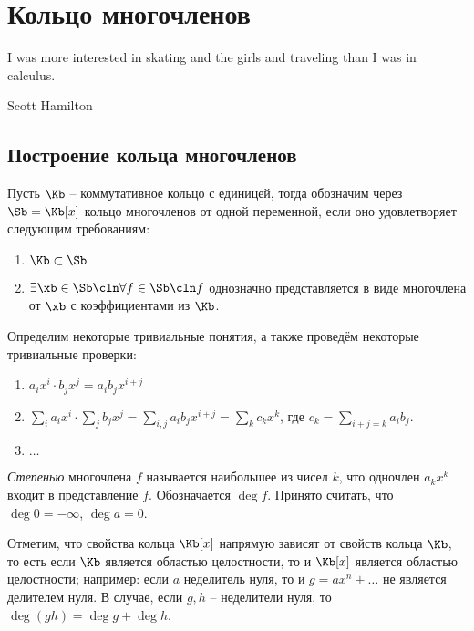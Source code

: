 \section{Кольцо многочленов}
\label{polynom}

\epigraph{I was more interested in skating and the girls and traveling
  than I was in calculus.}{Scott Hamilton}

\subsection{Построение кольца многочленов}

Пусть $\Kb$ -- коммутативное кольцо с единицей, тогда обозначим через $\Sb=\Kb[x]$ кольцо многочленов от одной переменной, если оно удовлетворяет следующим требованиям:

\begin{enumerate}
  \item $\Kb\subset\Sb$
  \item $\exists\xb\in\Sb\cln\forall f\in\Sb\cln f$ однозначно представляется в виде многочлена от $\xb$ с коэффициентами из $\Kb$.
\end{enumerate}

Определим некоторые тривиальные понятия, а также проведём некоторые тривиальные проверки:

\begin{enumerate}
  \item $a_ix^i\cdot b_jx^j = a_ib_jx^{i+j}$
  \item $\sum\limits_i a_ix^i\cdot\sum\limits_jb_jx^j=\sum\limits_{i,j}a_ib_jx^{i+j}=\sum\limits_kc_kx^k$, где $c_k=\sum\limits_{i+j=k}a_ib_j$.
  \item $\dots$
\end{enumerate}

\begin{df}
  \emph{Степенью} многочлена $f$ называется наибольшее из чисел $k$, что одночлен $a_kx^k$ входит в представление $f$. Обозначается $\deg f$. Принято считать, что $\deg0=-\infty$, $\deg a = 0$.
\end{df}

Отметим, что свойства кольца $\Kb[x]$ напрямую зависят от свойств кольца $\Kb$, то есть если $\Kb$ является областью целостности, то и $\Kb[x]$ является областью целостности; например: если $a$ неделитель нуля, то и $g=ax^n+\dots$ не является делителем нуля. В случае, если $g,h$ -- неделители нуля, то $\deg(gh)=\deg g+\deg h$.

